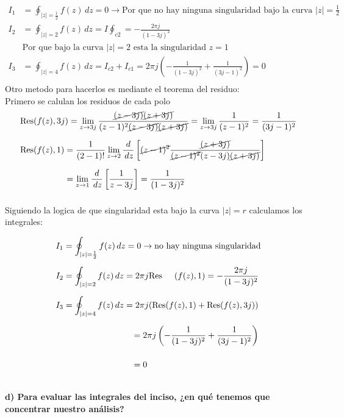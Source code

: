 \documentclass[12pt]{report}
\begin{document}
\begin{align*}
I_1&=\oint_{|z|=\frac{1}{2}}f(z) \, dz= 0 \rightarrow \text{Por que no hay ninguna singularidad bajo la curva $|z|=\frac{1}{2}$}\\[6pt]
I_2&=\oint_{|z|=2}f(z) \, dz = I \oint_{c2} = - \frac{2 \pi j}{(1-3j)^2}\\[6pt]
    &\text{Por que bajo la curva $|z|=2$ esta la singularidad $z=1$}\\[12pt]
I_3&= \oint_{|z|=4}f(z) \, dz = I_{c2}+I_{c1}=2 \pi j \left( -\frac{1}{(1-3j)^2} + \frac{1}{(3j-1)^2} \right) = 0 \\[6pt]
\end{align*}
Otro metodo para hacerlos es mediante el teorema del residuo:\\
Primero se calulan los residuos de cada polo\\
\begin{align*}
&\text{Res}(f(z),3j)= \lim_{z \to 3j} \frac{\cancel{(z-3j)}\cancel{(z+3j)}}{(z-1)^2\cancel{(z-3j)}\cancel{(z+3j)}}= \lim_{z \to 3j} \frac{1}{(z-1)^2}=\frac{1}{(3j-1)^2} \\[6pt]
&\text{Res}(f(z),1)=\frac{1}{(2-1)!} \lim_{z \to 2} \frac{d}{\,dz} \left[ \cancel{(z-1)^2} \frac{\cancel{(z+3j)}}{\cancel{(z-1)^2}(z-3j) \cancel{(z+3j)}} \right]\\[6pt]
&\phantom{\text{Res}(f(z),1)}= \lim_{z \to 1} \frac{d}{\,dz} \left[ \frac{1}{z-3j} \right]= \frac{1}{(1-3j)^2}\\[6pt]
\end{align*}

Siguiendo la logica de que singularidad esta bajo la curva $|z|=r$ calculamos los integrales:

\begin{align*}
I_1&= \oint_{|z|=\frac{1}{2}}f(z) \, dz = 0 \rightarrow \text{no hay ninguna singularidad}\\[6pt]
I_2&= \oint_{|z|=2}f(z) \, dz = 2 \pi j \text{Res}\hspace{0.5cm}(f(z),1)= -\frac{2 \pi j}{(1-3j)^2}\\[6pt]
I_3&= \oint_{|z|=4}f(z) \, dz = 2 \pi j(\text{Res}(f(z),1)+\text{Res}(f(z),3j))\\[6pt]
&\phantom{I_3=\oint_{|z|=4}f(z) \, dz } =2\pi j \left( -\frac{1}{(1-3j)^2} + \frac{1}{(3j-1)^2} \right)\\[6pt]
&\phantom{I_3=\oint_{|z|=4}f(z) \, dz }=0\\[6pt]
\end{align*}

\textbf{d) Para evaluar las integrales del inciso, ¿en qué tenemos que concentrar nuestro análisis?}\\
\end{document}
